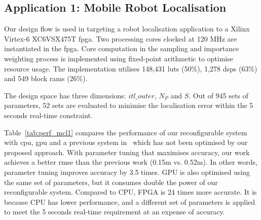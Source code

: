 

\subsection{Application 1: Mobile Robot Localisation}

Our design flow is used in targeting a robot localisation application to a Xilinx Virtex-6 XC6VSX475T \gls{fpga}.
Two processing cores clocked at 120 MHz are instantiated in the \gls{fpga}.
Core computation in the sampling and importance weighting process is implemented using fixed-point arithmetic to optimise resource usage.
The implementation utilises 148,431 \glspl{lut} (50\%), 1,278 \glspl{dsp} (63\%) and 549 block \glspl{ram} (26\%).

The design space has three dimensions: $itl\_outer$, $N_P$ and $S$.
Out of 945 sets of parameters, 52 sets are evaluated to minimise the localisation error within the 5 seconds real-time constraint.

Table~\ref{tab:perf_mcl1} compares the performance of our reconfigurable system with \gls{cpu}, \gls{gpu} and a previous system in~\cite{chau14trets} 
which has not been optimised by our proposed approach.
With parameter tuning that maximises accuracy, our work achieves a better \gls{rmse} than the previous work (0.15m vs. 0.52m).
In other words, parameter tuning improves accuracy by 3.5 times.
GPU is also optimised using the same set of parameters, but it consumes double the power of our reconfigurable system.
Compared to CPU, FPGA is 24 times more accurate.
It is because CPU has lower performance, and a different set of parameters is applied to meet the 5 seconds real-time requirement at an expense of accuracy.

